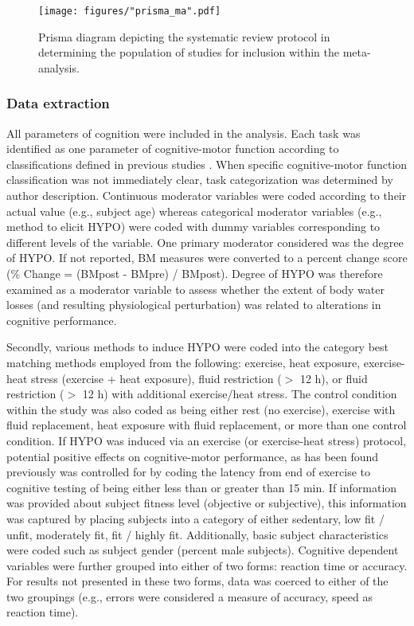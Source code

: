\begin{figure}
  	\centering
  	\texttt{[image: figures/"prisma\_ma".pdf]}
  	\caption{Prisma diagram depicting the systematic review protocol in determining the population of studies for inclusion within the meta-analysis.}
  	\label{fig:prisma}

\end{figure}

\subsubsection{Data extraction}
All parameters of cognition were included in the analysis. Each task was identified as one parameter of cognitive-motor function according to classifications defined in previous studies \cite{chang_effects_2012}. When specific cognitive-motor function classification was not immediately clear,  task categorization was determined by  author description. Continuous moderator variables were coded according to their actual value (e.g.,  subject age) whereas categorical moderator variables (e.g., method to elicit HYPO) were coded with dummy variables corresponding to different levels of the variable. One primary moderator considered was the degree of HYPO. If not reported, BM measures were converted to a percent change score (\% Change = (BMpost - BMpre) / BMpost). Degree of HYPO was therefore examined as a moderator variable to assess whether the extent of body water losses (and resulting physiological perturbation) was related to alterations in cognitive performance. 

Secondly, various methods to induce HYPO were coded into the category best matching methods employed from the following: exercise, heat exposure, exercise-heat stress (exercise + heat exposure), fluid restriction (${>}$ 12 h), or fluid restriction (${>}$ 12 h) with additional exercise/heat stress. The control condition within the study was also coded as being either rest (no exercise), exercise with fluid replacement, heat exposure with fluid replacement, or more than one control condition. If HYPO was induced via an exercise (or exercise-heat stress) protocol, potential positive effects on cognitive-motor performance, as has been found previously \cite{chang_effects_2012} was controlled for by coding the latency from end of exercise to cognitive testing of being either less than or greater than 15 min. If information was provided about subject fitness level (objective or subjective), this information was captured by placing subjects into a category of either sedentary, low fit / unfit, moderately fit, fit / highly fit. Additionally, basic subject characteristics were coded such as subject gender (percent male subjects). Cognitive dependent variables were further grouped into either of two forms: reaction time or accuracy. For results not presented in these two forms, data was coerced to either of the two groupings (e.g., errors were considered a measure of accuracy, speed as reaction time).       

